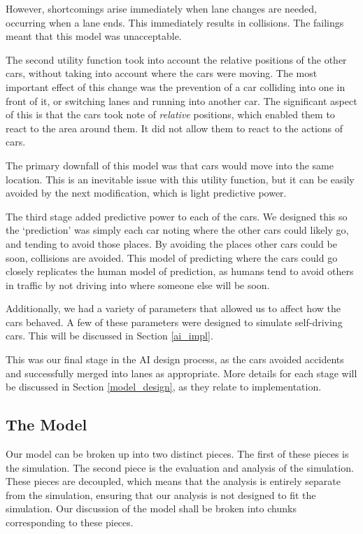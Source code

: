 \documentclass[a4paper, 11pt]{article}
\begin{document}
However, shortcomings arise immediately when lane changes are needed, occurring when a lane ends. This immediately results in collisions. 
The failings meant that this model was unacceptable. 

The second utility function took into account the relative positions of the other cars, without taking into account where the cars were moving. 
The most important effect of this change was the prevention of a car colliding into one in front of it, or switching lanes 
and running into another car. The significant aspect of this is that the cars took note of \textit{relative} positions, which enabled them to react 
to the area around them. It did not allow them to react to the actions of cars. 

The primary downfall of this model was that cars would move into the same location. This is an inevitable issue with this utility function, but it can 
be easily avoided by the next modification, which is light predictive power.

The third stage added predictive power to each of the cars. We designed this so the `prediction' was simply each car noting where the 
other cars could likely go, and tending to avoid those places. By avoiding the places other cars could be soon, collisions are avoided. 
This model of predicting where the cars could go closely replicates the human model of prediction, as humans tend to avoid others in traffic by not driving 
into where someone else will be soon. 

Additionally, we had a variety of parameters that allowed us to affect how the cars behaved. A few of these parameters were 
designed to simulate self-driving cars. This will be discussed in Section \ref{ai_impl}.

This was our final stage in the AI design process, as the cars avoided accidents and successfully merged into lanes as appropriate. More details for 
each stage will be discussed in Section \ref{model_design}, as they relate to implementation. 

\subsection{The Model}

Our model can be broken up into two distinct pieces. The first of these pieces is the simulation. The second piece is the evaluation and analysis of the simulation. These pieces are decoupled, which means that the analysis is entirely separate from the simulation, ensuring that our analysis is not designed to fit the simulation. Our discussion of the model shall be broken into chunks corresponding to these pieces. 
\end{document}
